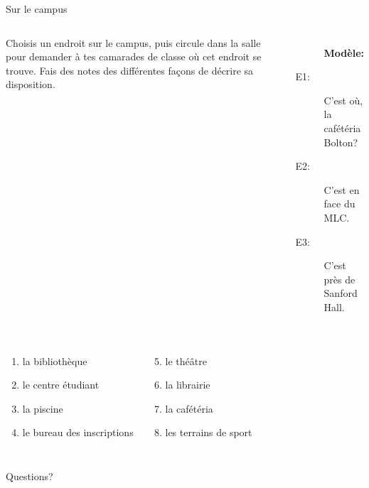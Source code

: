 \documentclass{beamer}
\begin{document}
  \begin{frame}{Sur le campus}
    \begin{columns}
        Choisis un endroit sur le campus, puis circule dans la salle pour demander à tes camarades de classe où cet endroit se trouve.
        Fais des notes des différentes façons de décrire sa disposition. \\
        {\small
        \begin{description}
          \item[] \textbf{Modèle:}
          \item[E1:] C'est où, la cafétéria Bolton?
          \item[E2:] C'est en face du MLC.
          \item[E3:] C'est près de Sanford Hall.
        \end{description}
        }
    \end{columns}
    \vspace{0.5cm}
    \begin{columns}
        \begin{enumerate}
          \item la bibliothèque
          \item le centre étudiant
          \item la piscine
          \item le bureau des inscriptions
        \end{enumerate}
        \begin{enumerate}
          \setcounter{enumi}{4}
          \item le théâtre
          \item la librairie
          \item la cafétéria
          \item les terrains de sport
        \end{enumerate}
    \end{columns}
  \end{frame}

  \begin{frame}{}
    \begin{center}
      \Large Questions?
    \end{center}
  \end{frame}
\end{document}
